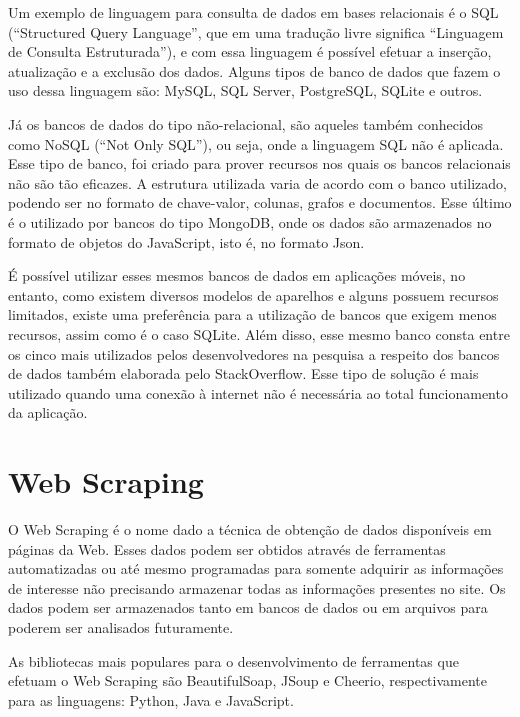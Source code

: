Um exemplo de linguagem para consulta de dados em bases relacionais é o SQL (``Structured Query Language'', que em uma tradução livre significa ``Linguagem de Consulta Estruturada''), e com essa linguagem é possível efetuar a inserção, atualização e a exclusão dos dados. Alguns tipos de banco de dados que fazem o uso dessa linguagem são: MySQL, SQL Server, PostgreSQL, SQLite e outros.\cite{tiposBancoDeDados} \cite{sqLite}

Já os bancos de dados do tipo não-relacional, são aqueles também conhecidos como NoSQL (``Not Only SQL''), ou seja, onde a linguagem SQL não é aplicada. Esse tipo de banco, foi criado para prover recursos nos quais os bancos relacionais não são tão eficazes. A estrutura utilizada varia de acordo com o banco utilizado, podendo ser no formato de chave-valor, colunas, grafos e documentos. Esse último é o utilizado por bancos do tipo MongoDB, onde os dados são armazenados no formato de objetos do JavaScript, isto é, no formato Json.\cite{mongoDBDefinition}

É possível utilizar esses mesmos bancos de dados em aplicações móveis, no entanto, como existem diversos modelos de aparelhos e alguns possuem recursos limitados, existe uma preferência para a utilização de bancos que exigem menos recursos, assim como é o caso SQLite. Além disso, esse mesmo banco consta entre os cinco mais utilizados pelos desenvolvedores na pesquisa a respeito dos bancos de dados também elaborada pelo StackOverflow.\cite{stackOverflowRanking} Esse tipo de solução é mais utilizado quando uma conexão à internet não é necessária ao total funcionamento da aplicação.\cite{mobileDatabase}

\section{Web Scraping}

O Web Scraping\cite{webscrapingRockContent} é o nome dado a técnica de obtenção de dados disponíveis em páginas da Web. Esses dados podem ser obtidos através de ferramentas automatizadas ou até mesmo programadas para somente adquirir as informações de interesse não precisando armazenar todas as informações presentes no site.
Os dados podem ser armazenados tanto em bancos de dados ou em arquivos para poderem ser analisados futuramente.

As bibliotecas mais populares para o desenvolvimento de ferramentas que efetuam o Web Scraping são BeautifulSoap, JSoup e Cheerio, respectivamente para as linguagens: Python, Java e JavaScript.\cite{cheerio} \cite{beautifulSoupDefinition} \cite{jSoupDefinition}

